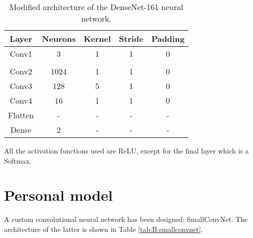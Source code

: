 \begin{table}[H]
    \centering
    \begin{tabular}{|c|c|c|c|c|}
        \hline
        \textbf{Layer} & \textbf{Neurons} & \textbf{Kernel} & \textbf{Stride} & \textbf{Padding} \\ \hline
        \hline
        Conv1 & 3 & 1 & 1 & 0 \\ \hline
        \rowcolor{LightGray}
        \multicolumn{5}{|c|}{Usual DenseNet-161 architecture \cite{huang2017densely}} \\ \hline
        Conv2 & 1024 & 1 & 1 & 0 \\ \hline
        Conv3 & 128 & 5 & 1 & 0 \\ \hline
        Conv4 & 16 & 1 & 1 & 0 \\ \hline
        Flatten & - & - & - & - \\ \hline
        Dense & 2 & - & - & - \\ \hline
    \end{tabular}
    \caption{Modified architecture of the DenseNet-161 neural network.}
    \label{tab:B.densenet.161}
\end{table}

All the activation functions used are ReLU, except for the final layer which is a Softmax.

\section{Personal model}

A custom convolutional neural network has been designed: SmallConvNet. The architecture of the latter is shown in Table \ref{tab:B.smallconvnet}.

